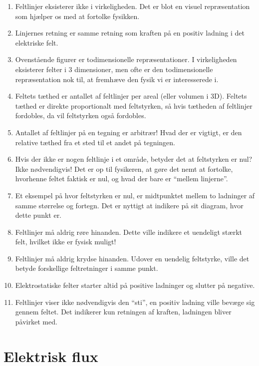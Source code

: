\begin{enumerate}
    \item Feltlinjer eksisterer ikke i virkeligheden. Det er blot en visuel repræsentation som hjælper os med at fortolke fysikken.
    \item Linjernes retning er samme retning som kraften på en positiv ladning i det elektriske felt.
    \item Ovenstående figurer er todimensionelle repræsentationer. I virkeligheden eksisterer felter i 3 dimensioner, men ofte er den todimensionelle repræsentation nok til, at fremhæve den fysik vi er interesserede i.
    \item Feltets tæthed er antallet af feltlinjer per areal (eller volumen i 3D). Feltets tæthed er direkte proportionalt med feltstyrken, så hvis tætheden af feltlinjer fordobles, da vil feltstyrken også fordobles.
    \item Antallet af feltlinjer på en tegning er arbitrær! Hvad der er vigtigt, er den relative tæthed fra et sted til et andet på tegningen.
    \item Hvis der ikke er nogen feltlinje i et område, betyder det at feltstyrken er nul? Ikke nødvendigvis! Det er op til fysikeren, at gøre det nemt at fortolke, hvorhenne feltet faktisk er nul, og hvad der bare er ``mellem linjerne''.
    \item Et eksempel på hvor feltstyrken er nul, er midtpunktet mellem to ladninger af samme størrelse og fortegn. Det er nyttigt at indikere på sit diagram, hvor dette punkt er.
    \item Feltlinjer må aldrig røre hinanden. Dette ville indikere et uendeligt stærkt felt, hvilket ikke er fysisk muligt!
    \item Feltlinjer må aldrig krydse hinanden. Udover en uendelig feltstyrke, ville det betyde forskellige feltretninger i samme punkt.
    \item Elektrostatiske felter starter altid på positive ladninger og slutter på negative.
    \item Feltlinjer viser ikke nødvendigvis den ``sti'', en positiv ladning ville bevæge sig gennem feltet. Det indikerer kun retningen af kraften, ladningen bliver påvirket med.
\end{enumerate}

\section{Elektrisk flux} \label{sec:elektrisk_flux}

